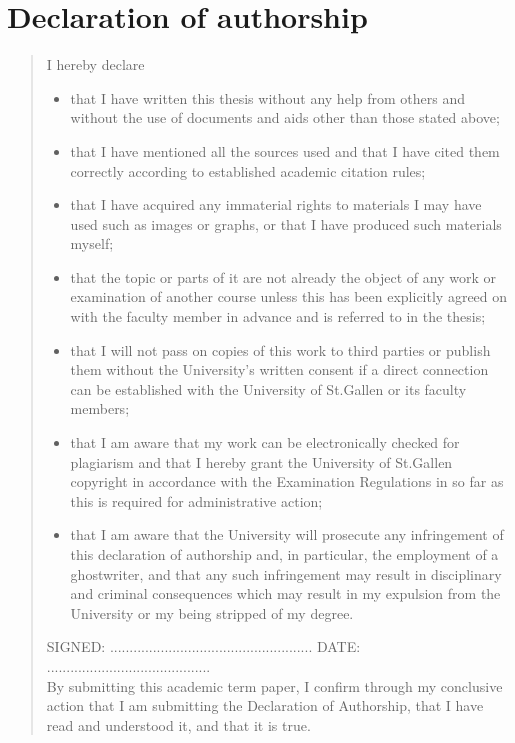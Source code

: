%
%
%
%
\chapter*{Declaration of authorship}
\begin{SingleSpace}
\begin{quote}
I hereby declare

\begin{itemize}
    \item that I have written this thesis without any help from others and without the use of documents and aids other than those stated above;
    \item that I have mentioned all the sources used and that I have cited them correctly according to established academic citation rules;
    \item that I have acquired any immaterial rights to materials I may have used such as images or graphs, or that I have produced such materials myself;
    \item that the topic or parts of it are not already the object of any work or examination of another course unless this has been explicitly agreed on with the faculty member in advance and is referred to in the thesis;
    \item that I will not pass on copies of this work to third parties or publish them without the University’s written consent if a direct connection can be established with the University of St.Gallen or its faculty members;
    \item that I am aware that my work can be electronically checked for plagiarism and that I hereby grant the University of St.Gallen copyright in accordance with the Examination Regulations in so far as this is required for administrative action;
    \item that I am aware that the University will prosecute any infringement of this declaration of authorship and, in particular, the employment of a ghostwriter, and that any such infringement may result in disciplinary and criminal consequences which may result in my expulsion from the University or my being stripped of my degree.
\end{itemize}


\vspace{1.5cm}
\noindent
\hspace{-0.75cm}\textsc{SIGNED: .................................................... DATE: ..........................................}\\

By submitting this academic term paper, I confirm through my conclusive action that I am
submitting the Declaration of Authorship, that I have read and understood it, and that it is
true.
\end{quote}
\end{SingleSpace}
\clearpage